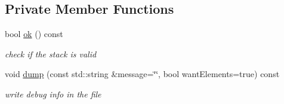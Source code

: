 \subsection*{Private Member Functions}
\begin{DoxyCompactItemize}
\item 
bool \hyperlink{class_my_stack_adcf03c60e2cc3c0fdc4384c6fc469066}{ok} () const
\begin{DoxyCompactList}\small\item\em check if the stack is valid \end{DoxyCompactList}\item 
void \hyperlink{class_my_stack_ac2c7329cc228ee255d98df9d9033daa3}{dump} (const std\+::string \&message=\char`\"{}\char`\"{}, bool want\+Elements=true) const
\begin{DoxyCompactList}\small\item\em write debug info in the file \end{DoxyCompactList}\end{DoxyCompactItemize}
